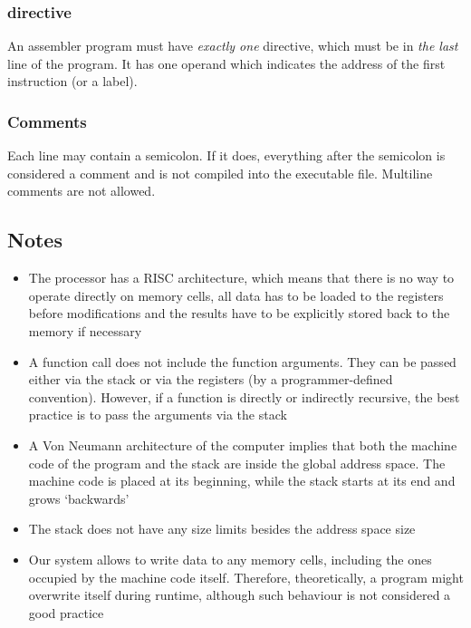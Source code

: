 \subsubsection{ directive}

An assembler program must have \textit{exactly one}  directive, which must be in \textit{the last} line of the program.
It has one operand which indicates the address of the first instruction (or a label).

\subsubsection{Comments}

Each line may contain a semicolon.
If it does, everything after the semicolon is considered a comment and is not compiled into the executable file.
Multiline comments are not allowed.

\vspace{.4in}

\subsection{Notes}

\begin{itemize}
    \item The  processor has a RISC architecture, which means that there is no way to operate directly on memory cells, all data has to be loaded to the registers before modifications and the results have to be explicitly stored back to the memory if necessary
    \item A function call does not include the function arguments.
    They can be passed either via the stack or via the registers (by a programmer-defined convention).
    However, if a function is directly or indirectly recursive, the best practice is to pass the arguments via the stack
    \item A Von Neumann architecture of the  computer implies that both the machine code of the program and the stack are inside the global address space.
    The machine code is placed at its beginning, while the stack starts at its end and grows `backwards'
    \item The stack does not have any size limits besides the address space size
    \item Our system allows to write data to any memory cells, including the ones occupied by the machine code itself.
    Therefore, theoretically, a program might overwrite itself during runtime, although such behaviour is not considered a good practice
\end{itemize}
